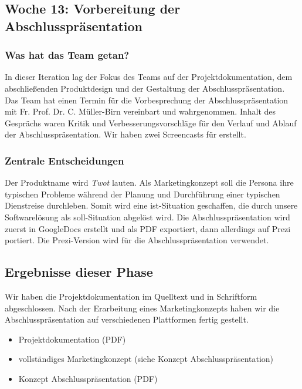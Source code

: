 \documentclass{article}
\begin{document}
\subsection{Woche 13: Vorbereitung der Abschlusspr\"asentation}

\subsubsection{Was hat das Team getan?}

In dieser Iteration lag der Fokus des Teams auf der Projektdokumentation, dem abschlie\ss enden Produktdesign und der Gestaltung der Abschlusspr\"asentation.\\
Das Team hat einen Termin f\"ur die Vorbesprechung der Abschlusspr\"asentation mit Fr. Prof. Dr. C. M\"uller-Birn vereinbart und wahrgenommen. Inhalt des Gespr\"achs waren Kritik und Verbesserungsvorschl\"age für den Verlauf und Ablauf der Abschlusspr\"asentation. Wir haben zwei Screencasts f\"ur erstellt.

\subsubsection{Zentrale Entscheidungen}

Der Produktname wird \textit{Twot} lauten. Als Marketingkonzept soll die Persona ihre typischen Probleme w\"ahrend der Planung und Durchf\"uhrung einer typischen Dienstreise durchleben. Somit wird eine ist-Situation geschaffen, die durch unsere Softwarel\"osung als soll-Situation abgel\"ost wird. Die Abschlusspr\"asentation wird zuerst in GoogleDocs erstellt und als PDF exportiert, dann allerdings auf Prezi portiert. Die Prezi-Version wird f\"ur die Abschlusspr\"asentation verwendet. 

\subsection{Ergebnisse dieser Phase}

Wir haben die Projektdokumentation im Quelltext und in Schriftform abgeschlossen. Nach der Erarbeitung eines Marketingkonzepts haben wir die Abschlusspr\"asentation auf verschiedenen Plattformen fertig gestellt.

\begin{itemize}
\item Projektdokumentation (PDF)
\item vollst\"andiges Marketingkonzept (siehe Konzept Abschlusspr\"asentation)
\item Konzept Abschlusspr\"asentation (PDF)
\end{itemize}
\end{document}
